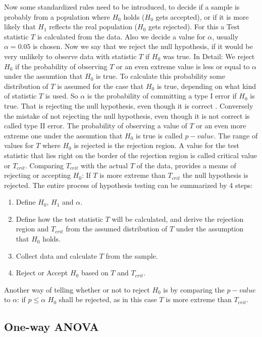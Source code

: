 \documentclass[12 pt]{scrartcl}
\begin{document}
Now some standardized rules need to be introduced, to decide if a sample is probably from a population where $H_0$ holds ($H_0$ gets accepted), or if it is more likely that $H_1$ reflects the real population ($H_0$ gets rejected). For this a Test statistic $T$ is calculated from the data. Also we decide a value for $\alpha$, usually $\alpha = 0.05$ is chosen.
Now we say that we reject the null hypothesis, if it would be very unlikely to observe data with statistic $T$ if $H_0$ was true. In Detail: We reject $H_0$ if the probability of observing $T$ or an even extreme value is less or equal to $\alpha$ under the assumtion that $H_0$ is true. To calculate this probability some distribution of $T$ is assumed for the case that $H_0$ is true, depending on what kind of statistic $T$ is used. So $\alpha$ is the probability of committing a type I error if $H_0$ is true. That is rejecting the null hypothesis, even though it is correct \citep[p.~222]{eid2017statistik}. Conversely the mistake of not rejecting the null hypothesis, even though it is not correct is called type II error.
The probability of observing a value of $T$ or an even more extreme one under the assumtion that $H_0$ is true is called $p-value$.
The range of values for $T$ where $H_0$ is rejected is the rejection region. A value for the test statistic that lies right on the border of the rejection region is called critical value or $T_{crit}$. Comparing $T_{crit}$ with the actual $T$ of the data, provides a means of rejecting or accepting $H_0$: If $T$ is more extreme than $T_{crit}$ the null hypothesis is rejected.
The entire process of hypothesis testing can be summarized by 4 steps:
\begin{enumerate}
  \item Define $H_0$, $H_1$ and $\alpha$.
  \item Define how the test statistic $T$ will be calculated, and derive the rejection region and $T_{crit}$ from the assumed distribution of $T$ under the assumption that $H_0$ holds.
  \item Collect data and calculate $T$ from the sample.
  \item Reject or Accept $H_0$ based on $T$ and $T_{crit}$.
\end{enumerate}
Another way of telling whether or not to reject $H_0$ is by comparing the $p-value$ to $\alpha$: if $p \leq \alpha$ $H_0$ shall be rejected, as in this case $T$ is more extreme than $T_{crit}$.


\subsection{One-way ANOVA}
\end{document}
